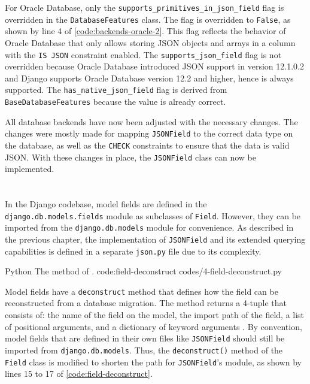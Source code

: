 For Oracle Database, only the \verb|supports_primitives_in_json_field| flag is
overridden in the \verb|DatabaseFeatures| class. The flag is overridden to
\verb|False|, as shown by line 4 of \autoref{code:backends-oracle-2}. This flag
reflects the behavior of Oracle Database that only allows storing JSON objects
and arrays in a column with the \verb|IS JSON| constraint enabled. The
\verb|supports_json_field| flag is not overridden because Oracle Database
introduced JSON support in version 12.1.0.2 and Django supports Oracle Database
version 12.2 and higher, hence  is always supported. The
\verb|has_native_json_field| flag is derived from \verb|BaseDatabaseFeatures|
because the value is already correct.

All database backends have now been adjusted with the necessary changes. The
changes were mostly made for mapping \verb|JSONField| to the correct data type
on the database, as well as the \verb|CHECK| constraints to ensure that the
data is valid JSON. With these changes in place, the \verb|JSONField| class can
now be implemented.

\section{}

In the Django codebase, model fields are defined in the
\verb|django.db.models.fields| module as subclasses of \verb|Field|. However,
they can be imported from the \verb|django.db.models| module for convenience.
As described in the previous chapter, the implementation of \verb|JSONField|
and its extended querying capabilities is defined in a separate \verb|json.py|
file due to its complexity.

\listing
{Python}
{The  method of .}
{code:field-deconstruct}
{codes/4-field-deconstruct.py}

Model fields have a \verb|deconstruct| method that defines how the field can be
reconstructed from a database migration. The method returns a 4-tuple that
consists of: the name of the field on the model, the import path of the field,
a list of positional arguments, and a dictionary of keyword arguments
\cite{django:model_fields}. By convention, model fields that are defined in
their own files like \verb|JSONField| should still be imported from
\verb|django.db.models|. Thus, the \verb|deconstruct()| method of the
\verb|Field| class is modified to shorten the path for \verb|JSONField|'s
module, as shown by lines 15 to 17 of \autoref{code:field-deconstruct}.

